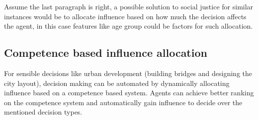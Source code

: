 Assume the last paragraph is right, a possible solution to social justice for similar instances would be to allocate influence based on how much the decision affects the agent, in this case features like age group could be factors for such allocation.

\subsection{Competence based influence allocation}

For sensible decisions like urban development (building bridges and designing the city layout), decision making can be automated by dynamically allocating influence based on a competence based system. Agents can achieve better ranking on the competence system and automatically gain influence to decide over the mentioned decision types.